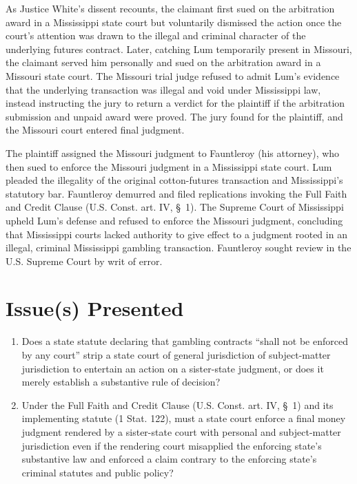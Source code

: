 \documentclass[12pt]{article}
\begin{document}
As Justice White's dissent recounts, the claimant first sued on the arbitration award in a Mississippi state court but voluntarily dismissed the action once the court's attention was drawn to the illegal and criminal character of the underlying futures contract. Later, catching Lum temporarily present in Missouri, the claimant served him personally and sued on the arbitration award in a Missouri state court. The Missouri trial judge refused to admit Lum's evidence that the underlying transaction was illegal and void under Mississippi law, instead instructing the jury to return a verdict for the plaintiff if the arbitration submission and unpaid award were proved. The jury found for the plaintiff, and the Missouri court entered final judgment.

The plaintiff assigned the Missouri judgment to Fauntleroy (his attorney), who then sued to enforce the Missouri judgment in a Mississippi state court. Lum pleaded the illegality of the original cotton-futures transaction and Mississippi's statutory bar. Fauntleroy demurred and filed replications invoking the Full Faith and Credit Clause (U.S. Const. art. IV, \S~1). The Supreme Court of Mississippi upheld Lum's defense and refused to enforce the Missouri judgment, concluding that Mississippi courts lacked authority to give effect to a judgment rooted in an illegal, criminal Mississippi gambling transaction. Fauntleroy sought review in the U.S. Supreme Court by writ of error.

\section{Issue(s) Presented}

\begin{enumerate}
    \item Does a state statute declaring that gambling contracts ``shall not be enforced by any court'' strip a state court of general jurisdiction of subject-matter jurisdiction to entertain an action on a sister-state judgment, or does it merely establish a substantive rule of decision?
    \item Under the Full Faith and Credit Clause (U.S. Const. art. IV, \S~1) and its implementing statute (1 Stat. 122), must a state court enforce a final money judgment rendered by a sister-state court with personal and subject-matter jurisdiction even if the rendering court misapplied the enforcing state's substantive law and enforced a claim contrary to the enforcing state's criminal statutes and public policy?
\end{enumerate}
\end{document}
